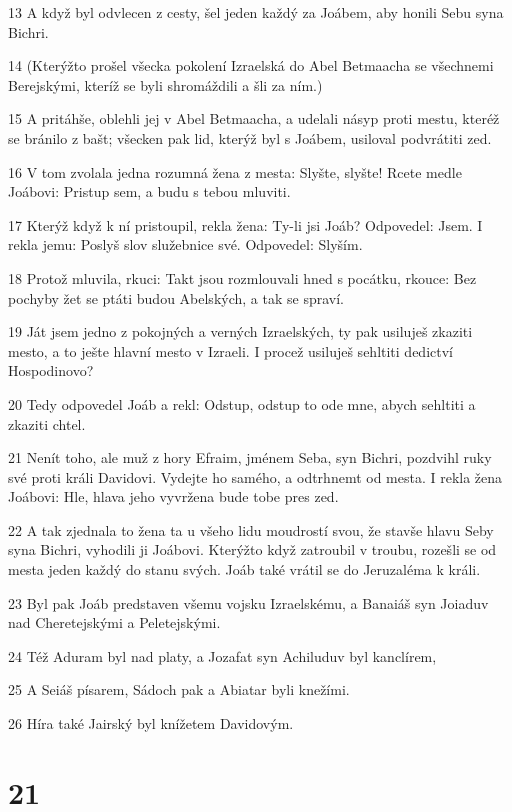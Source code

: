 \par 13 A když byl odvlecen z cesty, šel jeden každý za Joábem, aby honili Sebu syna Bichri.
\par 14 (Kterýžto prošel všecka pokolení Izraelská do Abel Betmaacha se všechnemi Berejskými, kteríž se byli shromáždili a šli za ním.)
\par 15 A pritáhše, oblehli jej v Abel Betmaacha, a udelali násyp proti mestu, kteréž se bránilo z bašt; všecken pak lid, kterýž byl s Joábem, usiloval podvrátiti zed.
\par 16 V tom zvolala jedna rozumná žena z mesta: Slyšte, slyšte! Rcete medle Joábovi: Pristup sem, a budu s tebou mluviti.
\par 17 Kterýž když k ní pristoupil, rekla žena: Ty-li jsi Joáb? Odpovedel: Jsem. I rekla jemu: Poslyš slov služebnice své. Odpovedel: Slyším.
\par 18 Protož mluvila, rkuci: Takt jsou rozmlouvali hned s pocátku, rkouce: Bez pochyby žet se ptáti budou Abelských, a tak se spraví.
\par 19 Ját jsem jedno z pokojných a verných Izraelských, ty pak usiluješ zkaziti mesto, a to ješte hlavní mesto v Izraeli. I procež usiluješ sehltiti dedictví Hospodinovo?
\par 20 Tedy odpovedel Joáb a rekl: Odstup, odstup to ode mne, abych sehltiti a zkaziti chtel.
\par 21 Nenít toho, ale muž z hory Efraim, jménem Seba, syn Bichri, pozdvihl ruky své proti králi Davidovi. Vydejte ho samého, a odtrhnemt od mesta. I rekla žena Joábovi: Hle, hlava jeho vyvržena bude tobe pres zed.
\par 22 A tak zjednala to žena ta u všeho lidu moudrostí svou, že stavše hlavu Seby syna Bichri, vyhodili ji Joábovi. Kterýžto když zatroubil v troubu, rozešli se od mesta jeden každý do stanu svých. Joáb také vrátil se do Jeruzaléma k králi.
\par 23 Byl pak Joáb predstaven všemu vojsku Izraelskému, a Banaiáš syn Joiaduv nad Cheretejskými a Peletejskými.
\par 24 Též Aduram byl nad platy, a Jozafat syn Achiluduv byl kanclírem,
\par 25 A Seiáš písarem, Sádoch pak a Abiatar byli knežími.
\par 26 Híra také Jairský byl knížetem Davidovým.

\chapter{21}

